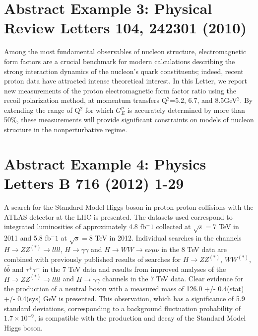 \documentclass{article}
\begin{document}
\section{Abstract Example 3: Physical Review Letters 104, 242301 (2010)}
Among the most fundamental observables of nucleon structure, electromagnetic
form factors are a crucial benchmark for modern calculations describing the
strong interaction dynamics of the nucleon's quark constituents; indeed,
recent proton data have attracted intense theoretical interest. In this
Letter, we report new measurements of the proton electromagnetic form factor
ratio using the recoil polarization method, at momentum transfers 
Q$^2$=5.2, 6.7, and 8.5GeV$^2$. By extending the range of Q$^2$ for which
$G_E^p$ is accurately determined by more than 50\%, these measurements will
provide significant constraints on models of nucleon structure in the
nonperturbative regime.

\section{Abstract Example 4: Physics Letters B 716 (2012) 1-29}
A search for the Standard Model Higgs boson in proton-proton collisions with the ATLAS detector at the LHC is presented. The datasets used correspond to integrated luminosities of approximately 4.8 fb$^-1$ collected at $\sqrt{s} = 7$ TeV in 2011 and 5.8 fb$^-1$ at $\sqrt{s} = 8$ TeV in 2012. Individual searches in the channels $H \rightarrow ZZ^{(*)}\rightarrow llll$, $H\rightarrow\gamma \gamma$ and $H\rightarrow WW \rightarrow e \nu \mu \nu$ in the 8 TeV data are combined with previously published results of searches for $H\rightarrow ZZ^{(*)}$, $WW^{(*)}$, $b\bar{b}$ and $\tau^+\tau^-$ in the 7 TeV data and results from improved analyses of the $H\rightarrow ZZ^{(*)}\rightarrow llll$ and $H\rightarrow \gamma \gamma$ channels in the 7 TeV data. Clear evidence for the production of a neutral boson with a measured mass of 126.0 +/- 0.4(stat) +/- 0.4(sys) GeV is presented. This observation, which has a significance of 5.9 standard deviations, corresponding to a background fluctuation probability of $1.7\times 10^{-9}$, is compatible with the production and decay of the Standard Model Higgs boson.
\end{document}
